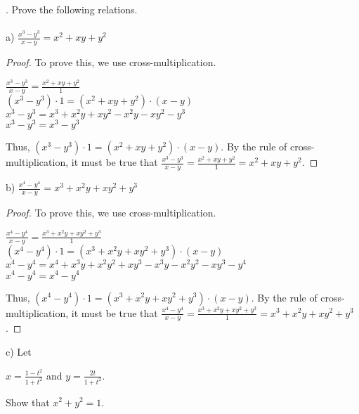 \documentclass[12pt]{article}
\begin{document}
. Prove the following relations. \\
\\
a) $\displaystyle \frac{x^3-y^3}{x-y}=x^2+xy+y^2$
\begin{proof}
To prove this, we use cross-multiplication.
\begin{center}
$\displaystyle \frac{x^3-y^3}{x-y}=\displaystyle \frac{x^2+xy+y^2}{1}$ \\
$(x^3-y^3)\cdot1=(x^2+xy+y^2)\cdot(x-y)$ \\
$x^3-y^3=x^3+x^2y+xy^2-x^2y-xy^2-y^3$ \\
$x^3-y^3=x^3-y^3$
\end{center}
Thus, $(x^3-y^3)\cdot1=(x^2+xy+y^2)\cdot(x-y)$. By the rule of cross-multiplication, it must be true that $\displaystyle \frac{x^3-y^3}{x-y}=\displaystyle \frac{x^2+xy+y^2}{1}=x^2+xy+y^2$.
\end{proof}
\noindent b) $\displaystyle \frac{x^4-y^4}{x-y}=x^3+x^2y+xy^2+y^3$
\begin{proof}
To prove this, we use cross-multiplication.
\begin{center}
$\displaystyle \frac{x^4-y^4}{x-y}=\displaystyle \frac{x^3+x^2y+xy^2+y^3}{1}$ \\
$(x^4-y^4)\cdot1=(x^3+x^2y+xy^2+y^3)\cdot(x-y)$ \\
$x^4-y^4=x^4+x^3y+x^2y^2+xy^3-x^3y-x^2y^2-xy^3-y^4$ \\
$x^4-y^4=x^4-y^4$
\end{center}
Thus, $(x^4-y^4)\cdot1=(x^3+x^2y+xy^2+y^3)\cdot(x-y)$. By the rule of cross-multiplication, it must be true that $\displaystyle \frac{x^4-y^4}{x-y}=\displaystyle \frac{x^3+x^2y+xy^2+y^3}{1}=x^3+x^2y+xy^2+y^3$.
\end{proof}
\noindent c) Let
\begin{center}
$x=\displaystyle \frac{1-t^2}{1+t^2}$
and
$y=\displaystyle \frac{2t}{1+t^2}$.
\end{center}
Show that $x^2+y^2=1$.
\end{document}
